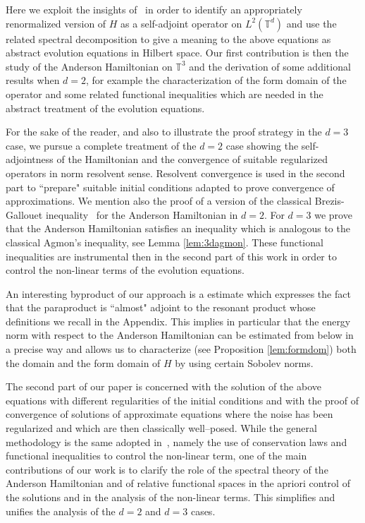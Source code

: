 \documentclass[11pt, oneside]{article}   	%
\begin{document}
Here we exploit the insights of~\cite{allez_continuous_2015} in order to identify an appropriately renormalized version of $H$ as a self-adjoint operator on $L^2(\mathbb{T}^d)$ and use the related spectral decomposition to give a meaning to the above equations as abstract evolution equations in Hilbert space. Our first contribution is then the study of the Anderson Hamiltonian on $\mathbb{T}^3$ and the derivation of some additional results when $d=2$, for example the characterization of the form domain of the operator and some related functional inequalities which are needed in the abstract treatment of the evolution equations. 

For the sake of the reader, and also to illustrate the proof strategy in the $d=3$ case, we pursue a complete treatment of the $d=2$ case showing the self-adjointness of the  Hamiltonian and  the convergence of suitable regularized operators in norm resolvent sense. Resolvent convergence is used in the second part to ``prepare" suitable initial conditions adapted to prove convergence of approximations. We mention also the proof of a version of the classical Brezis-Gallouet inequality~\cite{brga80} for the Anderson Hamiltonian in $d=2$. For $d=3$ we prove that the Anderson Hamiltonian satisfies an inequality   which is analogous to the classical Agmon's inequality, see Lemma \ref{lem:3dagmon}. These functional inequalities are instrumental then in the second part of this work in order to control the non-linear terms of the evolution equations.

An interesting byproduct of our approach is a estimate which expresses the fact that the paraproduct is ``almost" adjoint to the resonant product whose definitions we recall in the Appendix.  This implies in particular that the energy norm with respect to the Anderson Hamiltonian can be estimated from below in a precise way and allows us to characterize (see Proposition \ref{lem:formdom}) both the domain  and the form domain of $H$ by using  certain Sobolev norms. 

The second part of our paper is concerned with the solution of the above equations with different regularities of the initial conditions and with the proof of convergence of solutions of approximate equations where the noise has been regularized and which are then classically well--posed. While the general methodology is the same adopted in~\cite{debussche2016schr}, namely the use of conservation laws and functional inequalities to control the non-linear term, one of the main contributions of our work is to clarify the role of the spectral theory of the Anderson Hamiltonian and of relative functional spaces in the apriori control of the solutions and in the analysis of the non-linear terms. This simplifies and unifies the analysis of the $d=2$ and $d=3$ cases.
\end{document}
